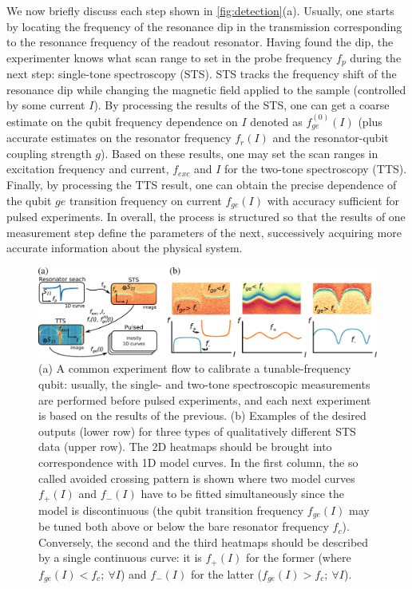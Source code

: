\documentclass[%
 aip,
 draft,
 amsmath,amssymb,
 reprint,%
]{revtex4-1}
\begin{document}
We now briefly discuss each step shown in \autoref{fig:detection}(a). Usually, one starts by locating the frequency of the resonance dip in the transmission corresponding to the resonance frequency of the readout resonator. Having found the dip, the experimenter knows what scan range to set in the probe frequency $f_p$ during the next step: single-tone spectroscopy (STS). STS tracks the frequency shift of the resonance dip while changing the magnetic field applied to the sample (controlled by some current $I$). By processing the results of the STS, one can get a coarse estimate on the qubit frequency dependence on $I$  denoted as  $f^{(0)}_{ge}(I)$ (plus accurate estimates on the resonator frequency $f_r(I)$ and the resonator-qubit coupling strength $g$). Based on these results, one may set the scan ranges in excitation frequency and current, $f_{exc}$ and $I$ for the two-tone spectroscopy (TTS). Finally, by processing the TTS result, one can obtain the precise dependence of the qubit $ge$ transition frequency on current $f_{ge}(I)$	 with accuracy sufficient for pulsed experiments. In overall, the process is structured so that the results of one measurement step define the parameters of the next, successively acquiring more accurate information about the physical system.

\begin{figure}
	\centering
	\includegraphics[width=0.95\linewidth]{detection_sts}
	\caption{(a) A common experiment flow to calibrate a tunable-frequency qubit: usually, the single- and two-tone spectroscopic measurements are performed before pulsed experiments, and each next experiment is based on the results of the previous. (b) Examples of the desired outputs (lower row) for three types of qualitatively different STS data (upper row). The 2D heatmaps should be brought into correspondence with 1D model curves. In the first column, the so called avoided crossing pattern is shown where two model curves $f_+(I)$ and $f_-(I)$ have to be fitted simultaneously since the model is discontinuous (the qubit transition frequency $f_{ge}(I)$ may be tuned both above or below the bare resonator frequency $f_c$). Conversely, the second and the third heatmaps should be described by a single continuous curve: it is $f_+(I)$ for the former (where $f_{ge}(I)<f_c;\ \forall I$) and $f_-(I)$ for the latter ($f_{ge}(I)>f_c;\ \forall I$).}
	\label{fig:detection}	
\end{figure} 
\end{document}
